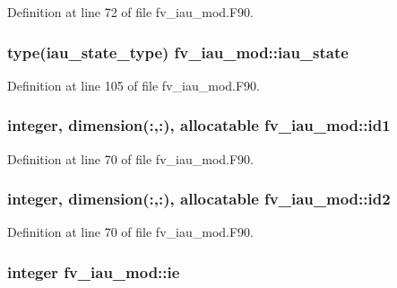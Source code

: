 Definition at line 72 of file fv\-\_\-iau\-\_\-mod.\-F90.

\subsubsection[{iau\-\_\-state}]{\setlength{\rightskip}{0pt plus 5cm}type({\bf iau\-\_\-state\-\_\-type}) fv\-\_\-iau\-\_\-mod\-::iau\-\_\-state\hspace{0.3cm}{\ttfamily [private]}}\label{classfv__iau__mod_a589667f66e33a418ed898421a7c10d93}


Definition at line 105 of file fv\-\_\-iau\-\_\-mod.\-F90.

\subsubsection[{id1}]{\setlength{\rightskip}{0pt plus 5cm}integer, dimension(\-:,\-:), allocatable fv\-\_\-iau\-\_\-mod\-::id1\hspace{0.3cm}{\ttfamily [private]}}\label{classfv__iau__mod_af29c8a827572b31a036d0abdf9e069ce}


Definition at line 70 of file fv\-\_\-iau\-\_\-mod.\-F90.

\subsubsection[{id2}]{\setlength{\rightskip}{0pt plus 5cm}integer, dimension(\-:,\-:), allocatable fv\-\_\-iau\-\_\-mod\-::id2\hspace{0.3cm}{\ttfamily [private]}}\label{classfv__iau__mod_a58dd6dc94c1c0d8573764ea8a8dbf8fe}


Definition at line 70 of file fv\-\_\-iau\-\_\-mod.\-F90.

\subsubsection[{ie}]{\setlength{\rightskip}{0pt plus 5cm}integer fv\-\_\-iau\-\_\-mod\-::ie\hspace{0.3cm}{\ttfamily [private]}}\label{classfv__iau__mod_af5515c4fa4f895ab74405846237a057b}



